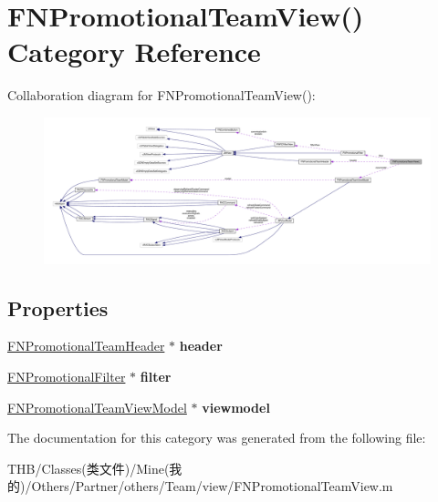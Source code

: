 \hypertarget{category_f_n_promotional_team_view_07_08}{}\section{F\+N\+Promotional\+Team\+View() Category Reference}
\label{category_f_n_promotional_team_view_07_08}


Collaboration diagram for F\+N\+Promotional\+Team\+View()\+:\nopagebreak
\begin{figure}[H]
\begin{center}
\leavevmode
\includegraphics[width=350pt]{category_f_n_promotional_team_view_07_08__coll__graph}
\end{center}
\end{figure}
\subsection*{Properties}
\begin{DoxyCompactItemize}
\item 
\mbox{\label{category_f_n_promotional_team_view_07_08_a4b5b07bb090797130b17ccf44746c492}} 
\mbox{\hyperlink{interface_f_n_promotional_team_header}{F\+N\+Promotional\+Team\+Header}} $\ast$ {\bfseries header}
\item 
\mbox{\label{category_f_n_promotional_team_view_07_08_a151257e8491912c7d14434874357f5ff}} 
\mbox{\hyperlink{interface_f_n_promotional_filter}{F\+N\+Promotional\+Filter}} $\ast$ {\bfseries filter}
\item 
\mbox{\label{category_f_n_promotional_team_view_07_08_aa3000e0ed6475b5e2eb4608414f48221}} 
\mbox{\hyperlink{interface_f_n_promotional_team_view_model}{F\+N\+Promotional\+Team\+View\+Model}} $\ast$ {\bfseries viewmodel}
\end{DoxyCompactItemize}


The documentation for this category was generated from the following file\+:\begin{DoxyCompactItemize}
\item 
T\+H\+B/\+Classes(类文件)/\+Mine(我的)/\+Others/\+Partner/others/\+Team/view/F\+N\+Promotional\+Team\+View.\+m\end{DoxyCompactItemize}
